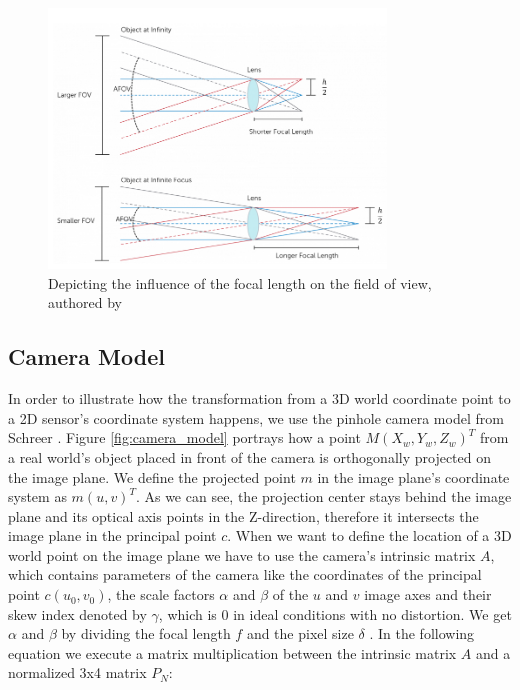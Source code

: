 \begin{figure}[h]
\centering
\includegraphics[width=0.8\textwidth]{images/camera_fov.png}
\caption[Single camera's FoV]{Depicting the influence of the focal length on the field of view, authored by \cite{camera_fov_website} \label{fig:camera_fov}}
\end{figure}

\subsection{Camera Model}\label{camera_model}
In order to illustrate how the transformation from a 3D world coordinate point to a 2D sensor's coordinate system happens, we use the pinhole camera model from Schreer \cite{camera_pinhole_model}. Figure \ref{fig:camera_model} portrays how a point $M(X_{w}, Y_{w}, Z_{w})^{T}$ from a real world's object placed in front of the camera is orthogonally projected on the image plane. We define the projected point $m$ in the image plane's coordinate system as $m(u,v)^{T}$. As we can see, the projection center stays behind the image plane and its optical axis points in the Z-direction, therefore it intersects the image plane in the principal point $c$. When we want to define the location of a 3D world point on the image plane we have to use the camera's intrinsic matrix $A$, which contains parameters of the camera like the coordinates of the principal point $c(u_{0},v_{0})$, the scale factors $\alpha$ and $\beta$ of the $u$ and $v$ image axes and their skew index denoted by $\gamma$, which is 0 in ideal conditions with no distortion. We get $\alpha$ and $\beta$ by dividing the focal length $f$ and the pixel size $\delta$ . In the following equation we execute a matrix multiplication between the intrinsic matrix $A$ and a normalized 3x4 matrix $P_{N}$:

